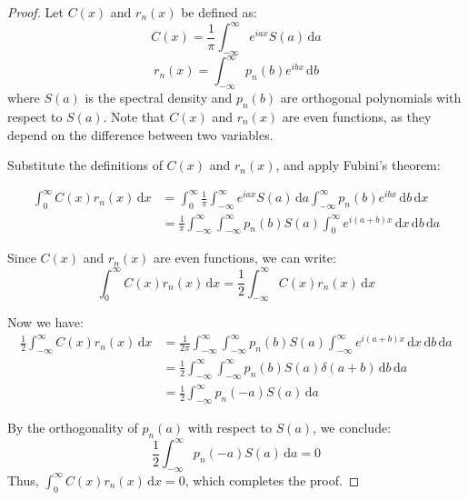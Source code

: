 \documentclass{article}
\begin{document}
\begin{proof}
Let $C (x)$ and $r_n (x)$ be defined as:
\begin{equation}
C (x) = \frac{1}{\pi} \int_{- \infty}^{\infty} e^{iax} S (a) 
\, \mathrm{d} a
\end{equation}
\begin{equation}
r_n (x) = \int_{- \infty}^{\infty} p_n (b) e^{ibx} \, \mathrm{d} b
\end{equation}
where $S (a)$ is the spectral density and $p_n (b)$ are orthogonal
polynomials with respect to $S (a)$. Note that $C (x)$ and $r_n (x)$ are
even functions, as they depend on the difference between two variables.

Substitute the definitions of $C (x)$ and $r_n (x)$, and apply Fubini's
theorem:

\begin{align*}
\int_0^{\infty} C (x) r_n (x) \, \mathrm{d} x &= \int_0^{\infty}
\frac{1}{\pi} \int_{- \infty}^{\infty} e^{iax} S (a) 
\, \mathrm{d} a \int_{- \infty}^{\infty} p_n (b) e^{ibx} 
\, \mathrm{d} b \, \mathrm{d} x \\
&= \frac{1}{\pi} \int_{- \infty}^{\infty} \int_{- \infty}^{\infty} p_n
(b) S (a) \int_0^{\infty} e^{i (a + b) x} \, \mathrm{d} x
\, \mathrm{d} b \, \mathrm{d} a 
\end{align*}

Since $C (x)$ and $r_n (x)$ are even functions, we can write:
\begin{equation}
\int_0^{\infty} C (x) r_n (x) \, \mathrm{d} x = \frac{1}{2} \int_{-\infty}^{\infty} C (x) r_n (x) \, \mathrm{d} x
\end{equation}

Now we have:
\begin{align*}
\frac{1}{2} \int_{-\infty}^{\infty} C (x) r_n (x) \, \mathrm{d} x &= 
\frac{1}{2\pi} \int_{- \infty}^{\infty} \int_{- \infty}^{\infty} p_n (b) S (a) \int_{-\infty}^{\infty} e^{i (a + b) x} \, \mathrm{d} x \, \mathrm{d} b \, \mathrm{d} a \\
&= \frac{1}{2} \int_{- \infty}^{\infty} \int_{- \infty}^{\infty} p_n (b) S (a) \delta(a + b) \, \mathrm{d} b \, \mathrm{d} a \\
&= \frac{1}{2} \int_{- \infty}^{\infty} p_n (-a) S (a) \, \mathrm{d} a
\end{align*}

By the orthogonality of $p_n (a)$ with respect to $S (a)$, we conclude:
\begin{equation}
\frac{1}{2} \int_{- \infty}^{\infty} p_n (-a) S (a) \, \mathrm{d} a = 0
\end{equation}
Thus, $\int_0^{\infty} C (x) r_n (x) \, \mathrm{d} x = 0$, which completes the proof.
\end{proof}
\end{document}
